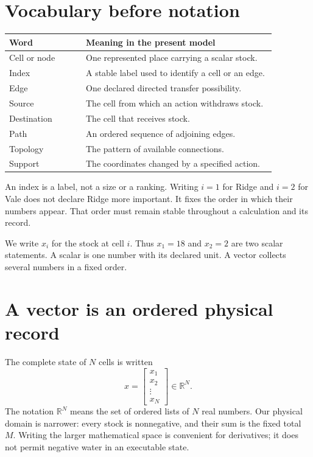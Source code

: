 \section{Vocabulary before notation}
\begin{center}
\begin{tabular}{P{0.25\linewidth}P{0.62\linewidth}}
\toprule
Word & Meaning in the present model\\
\midrule
Cell or node & One represented place carrying a scalar stock.\\
Index & A stable label used to identify a cell or an edge.\\
Edge & One declared directed transfer possibility.\\
Source & The cell from which an action withdraws stock.\\
Destination & The cell that receives stock.\\
Path & An ordered sequence of adjoining edges.\\
Topology & The pattern of available connections.\\
Support & The coordinates changed by a specified action.\\
\bottomrule
\end{tabular}
\end{center}
An index is a label, not a size or a ranking. Writing \(i=1\) for Ridge and \(i=2\) for Vale does not declare Ridge more important. It fixes the order in which their numbers appear. That order must remain stable throughout a calculation and its record.

We write \(x_i\) for the stock at cell \(i\). Thus \(x_1=18\) and \(x_2=2\) are two scalar statements. A scalar is one number with its declared unit. A vector collects several numbers in a fixed order.

\section{A vector is an ordered physical record}
The complete state of \(N\) cells is written
\begin{equation}
 x=\begin{bmatrix}x_1\\x_2\\\vdots\\x_N\end{bmatrix}\in\mathbb{R}^N.
\end{equation}
The notation \(\mathbb{R}^N\) means the set of ordered lists of \(N\) real numbers. Our physical domain is narrower: every stock is nonnegative, and their sum is the fixed total \(M\). Writing the larger mathematical space is convenient for derivatives; it does not permit negative water in an executable state.

